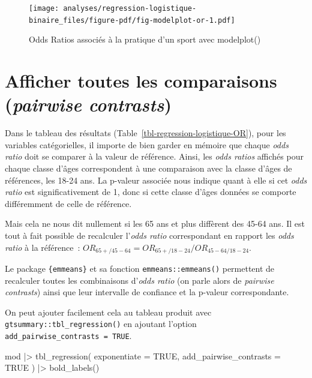 \documentclass[
  letterpaper,
  DIV=11,
  numbers=noendperiod,
  oneside]{scrreprt}
\newenvironment{Shaded}{\begin{snugshade}}{\end{snugshade}}
\newcommand{\AttributeTok}[1]{\textcolor[rgb]{0.40,0.45,0.13}{#1}}
\newcommand{\ConstantTok}[1]{\textcolor[rgb]{0.56,0.35,0.01}{#1}}
\newcommand{\FunctionTok}[1]{\textcolor[rgb]{0.28,0.35,0.67}{#1}}
\newcommand{\NormalTok}[1]{\textcolor[rgb]{0.00,0.23,0.31}{#1}}
\newcommand{\SpecialCharTok}[1]{\textcolor[rgb]{0.37,0.37,0.37}{#1}}
\begin{document}
\begin{figure}[H]

{\centering \texttt{[image: analyses/regression-logistique-binaire\_files/figure-pdf/fig-modelplot-or-1.pdf]}

}

\caption{\label{fig-modelplot-or}Odds Ratios associés à la pratique d'un
sport avec modelplot()}

\end{figure}

\hypertarget{afficher-toutes-les-comparaisons-pairwise-contrasts}{%
\section{\texorpdfstring{Afficher toutes les comparaisons
(\emph{pairwise
contrasts})}{Afficher toutes les comparaisons (pairwise contrasts)}}\label{afficher-toutes-les-comparaisons-pairwise-contrasts}}

Dans le tableau des résultats
(Table~\ref{tbl-regression-logistique-OR}), pour les variables
catégorielles, il importe de bien garder en mémoire que chaque
\emph{odds ratio} doit se comparer à la valeur de référence. Ainsi, les
\emph{odds ratios} affichés pour chaque classe d'âges correspondent à
une comparaison avec la classe d'âges de références, les 18-24 ans. La
p-valeur associée nous indique quant à elle si cet \emph{odds ratio} est
significativement de 1, donc si cette classe d'âges données se comporte
différemment de celle de référence.

Mais cela ne nous dit nullement si les 65 ans et plus diffèrent des
45-64 ans. Il est tout à fait possible de recalculer l'\emph{odds ratio}
correspondant en rapport les \emph{odds ratio} à la référence~:
\(OR_{65+/45-64}=OR_{65+/18-24}/OR_{45-64/18-24}\).

Le package \texttt{\{emmeans\}} et sa fonction
\texttt{emmeans::emmeans()} permettent de recalculer toutes les
combinaisons d'\emph{odds ratio} (on parle alors de \emph{pairwise
contrasts}) ainsi que leur intervalle de confiance et la p-valeur
correspondante.

On peut ajouter facilement cela au tableau produit avec
\texttt{gtsummary::tbl\_regression()} en ajoutant l'option
\texttt{add\_pairwise\_contrasts\ =\ TRUE}.

\begin{Shaded}
\begin{Highlighting}[]
\NormalTok{mod }\SpecialCharTok{|\textgreater{}} 
  \FunctionTok{tbl\_regression}\NormalTok{(}
    \AttributeTok{exponentiate =} \ConstantTok{TRUE}\NormalTok{,}
    \AttributeTok{add\_pairwise\_contrasts =} \ConstantTok{TRUE}
\NormalTok{  ) }\SpecialCharTok{|\textgreater{}} 
  \FunctionTok{bold\_labels}\NormalTok{()}
\end{Highlighting}
\end{Shaded}
\end{document}
